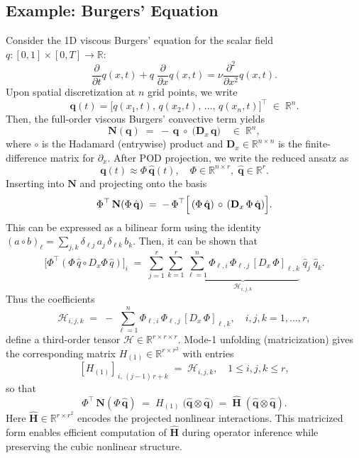 \subsection*{Example: Burgers' Equation}
Consider the 1D viscous Burgers' equation for the scalar field $q:[0,1]\times [0,T]\to\mathbb{R}$:\\
$$\frac{\partial }{\partial t}q(x,t) + q\;\frac{\partial }{\partial x}q(x,t) = \nu \frac{\partial^2}{\partial x^2}q(x,t).$$
Upon spatial discretization at \(n\) grid points, we write\\
$$\mathbf{q}(t) = \bigl[q(x_1,t),\,q(x_2,t),\,\dots,\,q(x_n,t)\bigr]^{\top}
  \;\in\;\mathbb{R}^n.$$
Then, the full-order viscous Burgers’ convective term yields\\
$$\mathbf{N}(\mathbf{q}) \;=\; -\,\mathbf{q}\;\circ\;\bigl(\mathbf{D}_x\,\mathbf{q}\bigr)
\quad\in\;\mathbb{R}^n,$$
where $\circ$ is the Hadamard (entrywise) product and $\mathbf{D}_x\in\mathbb{R}^{n\times n}$ is the finite-difference matrix for $\partial_x$. After POD projection, we write the reduced ansatz as\\$$\mathbf{q}(t)\approx \Phi\,\hat{\mathbf{q}}(t),\quad \Phi\in\mathbb{R}^{n\times r},\;\hat{\mathbf{q}}\in\mathbb{R}^r.$$ Inserting into $\mathbf{N}$ and projecting onto the basis\\$$\Phi^{\top}\,\mathbf{N}(\Phi\,\hat{\mathbf{q}})\;=\;
    -\,\Phi^{\top} \Bigl[\,( \Phi\,\hat{\mathbf{q}})\,\circ\,(\mathbf{D}_x\,\Phi\,\hat{\mathbf{q}})\Bigr].$$
This can be expressed as a bilinear form using the identity $\displaystyle (a\circ b)_\ell = \sum_{j,k}\delta_{\ell j}\,a_j\,\delta_{\ell k}\,b_k$. Then, it can be shown that\\$$\bigl[\Phi^{\top}(\Phi\,\hat q\circ D_x\Phi\,\hat q)\bigr]_i
    \;=\;
    \sum_{j=1}^r\sum_{k=1}^r
      \underbrace{\sum_{\ell=1}^n \Phi_{\ell,i}\,\Phi_{\ell,j}\,[D_x\,\Phi]_{\ell,k}}_{\,\mathcal{H}_{i,j,k}\,}
    \;\hat q_j\;\hat q_k.$$
  Thus the coefficients\\
  $$\mathcal{H}_{i,j,k}
    \;=\;
    -\,\sum_{\ell=1}^n \Phi_{\ell,i}\,\Phi_{\ell,j}\,[D_x\,\Phi]_{\ell,k},
    \quad
    i,j,k=1,\dots,r,$$
  define a third-order tensor $\mathcal{H}\in\mathbb{R}^{r\times r\times r}$. Mode-1 unfolding (matricization) gives the corresponding matrix
  $H_{(1)}\in\mathbb{R}^{r\times r^2}$ with entries\\
  $$[H_{(1)}]_{\,i,\,(j-1)\,r + k}
    \;=\;
    \mathcal{H}_{i,j,k},
    \quad
    1\le i,j,k\le r,$$
  so that\\
  $$\Phi^{\top}\,\mathbf{N}(\Phi\,\hat{\mathbf{q}})
    \;=\;
    H_{(1)}\;\bigl(\hat{\mathbf{q}}\otimes\hat{\mathbf{q}}\bigr)
    \;=\;
    \hat{\mathbf{H}}\;(\hat{\mathbf{q}}\otimes\hat{\mathbf{q}}).$$
Here $\hat{\mathbf{H}} \in \mathbb{R}^{r \times r^2}$ encodes the projected nonlinear interactions. This matricized form enables efficient computation of $\hat{\mathbf{H}}$ during operator inference while preserving the cubic nonlinear structure.
\newpage
